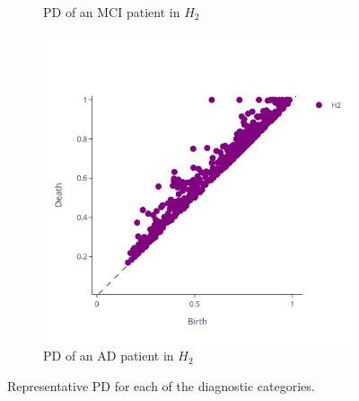 \documentclass{article}
\begin{document}
\begin{figure}[htb]
\begin{subfigure}{0.32\textwidth}
    \caption{PD of an MCI patient in $H_2$}
  \end{subfigure}
  \begin{subfigure}{0.32\textwidth}
    \includegraphics[width=\textwidth]{figures/PDs/persistence_diagram_AD_H_2.png}
    \caption{PD of an AD patient in $H_2$}
  \end{subfigure}
  \caption{Representative PD for each of the diagnostic categories.}
  \label{fig:sample_rep_pd}
\end{figure}
\end{document}
